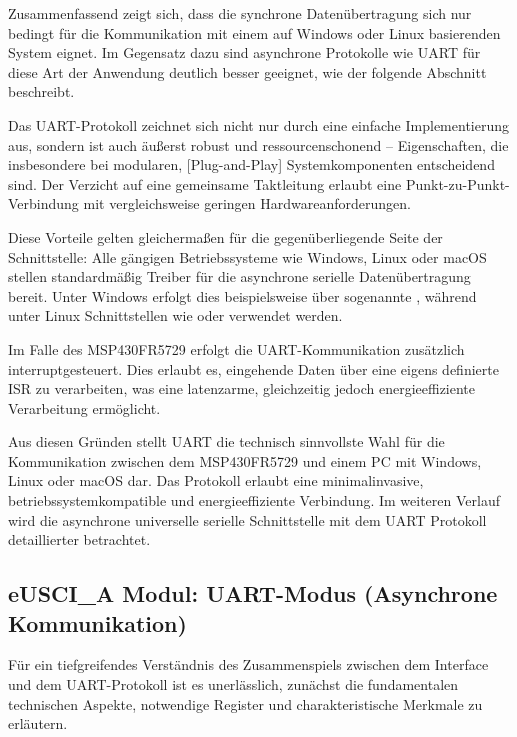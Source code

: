 Zusammenfassend zeigt sich, dass die synchrone Daten\"ubertragung sich nur bedingt f\"ur die Kommunikation mit einem auf Windows oder Linux basierenden System eignet. Im Gegensatz dazu sind asynchrone Protokolle wie UART f\"ur diese Art der Anwendung deutlich besser geeignet, wie der folgende Abschnitt beschreibt. 

Das UART-Protokoll zeichnet sich nicht nur durch eine einfache Implementierung aus, sondern ist auch \"au{\ss}erst robust und ressourcenschonend -- Eigenschaften, die insbesondere bei modularen, [Plug-and-Play] Systemkomponenten entscheidend sind. Der Verzicht auf eine gemeinsame Taktleitung erlaubt eine Punkt-zu-Punkt-Verbindung mit vergleichsweise geringen Hardwareanforderungen. 

\newpage
Diese Vorteile gelten gleicherma{\ss}en f\"ur die gegen\"uberliegende Seite der Schnittstelle: Alle g\"angigen Betriebssysteme wie Windows, Linux oder macOS stellen standardm\"a{\ss}ig Treiber f\"ur die asynchrone serielle Daten\"ubertragung bereit. Unter Windows erfolgt dies beispielsweise \"uber sogenannte , w\"ahrend unter Linux Schnittstellen wie  oder  verwendet werden. 

Im Falle des MSP430FR5729 erfolgt die UART-Kommunikation zus\"atzlich interruptgesteuert. Dies erlaubt es, eingehende Daten \"uber eine eigens definierte ISR zu verarbeiten, was eine latenzarme, gleichzeitig jedoch energieeffiziente Verarbeitung erm\"oglicht. 

Aus diesen Gr\"unden stellt UART die technisch sinnvollste Wahl f\"ur die Kommunikation zwischen dem MSP430FR5729 und einem PC mit Windows, Linux oder macOS dar. Das Protokoll erlaubt eine minimalinvasive, betriebssystemkompatible und energieeffiziente Verbindung. Im weiteren Verlauf wird die asynchrone universelle serielle Schnittstelle mit dem UART Protokoll detaillierter betrachtet.\AI

\subsection{eUSCI\_A Modul: UART-Modus (Asynchrone Kommunikation)}
\label{sec:eUSCI_UART}

F\"ur ein tiefgreifendes Verst\"andnis des Zusammenspiels zwischen dem Interface und dem UART-Protokoll ist es unerl\"asslich, zun\"achst die fundamentalen technischen Aspekte, notwendige Register und charakteristische Merkmale zu erl\"autern.

